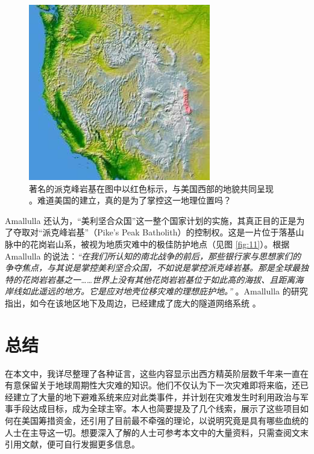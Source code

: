 \documentclass[10pt,twocolumn,letterpaper]{article}
\begin{document}
\begin{figure}[t]
\begin{center}
   \includegraphics[width=1\linewidth]{pike.jpg}
\end{center}
   \caption{著名的派克峰岩基在图中以红色标示，与美国西部的地貌共同呈现 \cite{36}。难道美国的建立，真的是为了掌控这一地理位置吗？}
\label{fig:11}
\label{fig:onecol}
\end{figure}

Amallulla 还认为，“美利坚合众国”这一整个国家计划的实施，其真正目的正是为了夺取对“派克峰岩基”（Pike’s Peak Batholith）的控制权。这是一片位于落基山脉中的花岗岩山系，被视为地质灾难中的极佳防护地点（见图 \ref{fig:11}）。根据 Amallulla 的说法：\textit{“在我们所认知的南北战争的前后，那些银行家与思想家们的争夺焦点，与其说是掌控美利坚合众国，不如说是掌控派克峰岩基。那是全球最独特的花岗岩岩基之一……世界上没有其他花岗岩岩基位于如此高的海拔、且距离海岸线如此遥远的地方。它是应对地壳位移灾难的理想庇护地。”} \cite{33,34}。Amallulla 的研究指出，如今在该地区地下及周边，已经建成了庞大的隧道网络系统 \cite{36}。
\section{总结}

在本文中，我详尽整理了各种证言，这些内容显示出西方精英阶层数千年来一直在有意保留关于地球周期性大灾难的知识。他们不仅认为下一次灾难即将来临，还已经建立了大量的地下避难系统来应对此类事件，并计划在灾难发生时利用政治与军事手段达成目标，成为全球主宰。本人也简要提及了几个线索，展示了这些项目如何在美国筹措资金，还引用了目前最不牵强的理论，以说明究竟是具有哪些血统的人士在主导这一切。想要深入了解的人士可参考本文中的大量资料，只需查阅文末引用文献，便可自行发掘更多信息。
\end{document}
